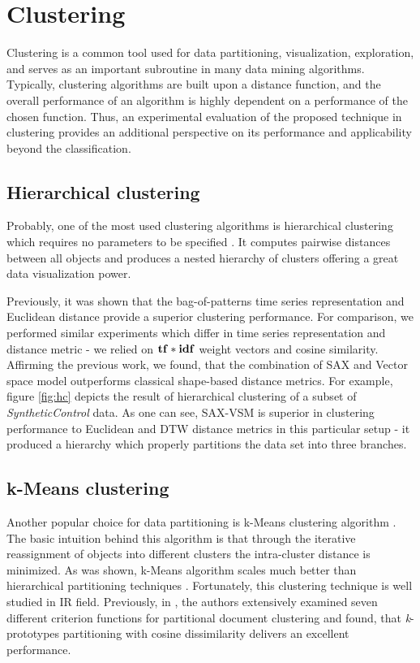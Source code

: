 \section{Clustering}
Clustering is a common tool used for data partitioning, visualization, exploration, and serves as
an important subroutine in many data mining algorithms. Typically, clustering algorithms
are built upon a distance function, and the overall performance of an algorithm is highly
dependent on a performance of the chosen function. Thus, an experimental evaluation of the 
proposed technique in clustering provides an additional perspective on its performance and
applicability beyond the classification.

\subsection{Hierarchical clustering}
Probably, one of the most used clustering algorithms is hierarchical clustering which requires no
parameters to be specified \cite{citeulike:1576606}. It computes pairwise distances between all objects and 
produces a nested hierarchy of clusters offering a great data visualization power. 

Previously, it was shown that the bag-of-patterns time series representation and Euclidean distance
provide a superior clustering performance\cite{citeulike:10525778}. 
For comparison, we performed similar experiments which differ in time series representation and
distance metric - we relied on $\text{\textbf{tf}}\ast\text{\textbf{idf}}$ weight vectors and cosine similarity. 
Affirming the previous work, we found, that the combination of SAX and Vector space model
outperforms classical shape-based distance metrics. 
For example, figure \ref{fig:hc} depicts the result of hierarchical clustering of a subset of
\textit{SyntheticControl} data. 
As one can see, SAX-VSM is superior in clustering performance to Euclidean and DTW distance 
metrics in this particular setup - it produced a hierarchy which properly partitions the
data set into three branches.

\subsection{k-Means clustering}
Another popular choice for data partitioning is k-Means clustering algorithm \cite{kmeans}.
The basic intuition behind this algorithm is that through the iterative reassignment of objects 
into different clusters the intra-cluster distance is minimized. As was shown, k-Means 
algorithm scales much better than hierarchical partitioning techniques \cite{citeulike:4195343}.
Fortunately, this clustering technique is well studied in IR field. Previously, in \cite{citeulike:505248}, the
authors extensively examined seven different criterion functions for partitional document
clustering and found, that \textit{k}-prototypes partitioning with cosine dissimilarity delivers an
excellent performance. 


